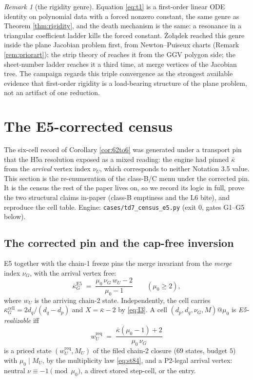 \documentclass[11pt]{article}
\theoremstyle{definition}
\theoremstyle{remark}
\newtheorem{remark}[theorem]{Remark}
\newcommand{\kb}{\bar\kappa}
\begin{document}
\begin{remark}[the rigidity genre]\label{rem:genre}
Equation \eqref{eq:t1} is a first-order linear ODE identity on polynomial data with a forced nonzero constant, the same genre as Theorem \ref{thm:rigidity}, and the death mechanism is the same: a resonance in a triangular coefficient ladder kills the forced constant. \.Zo{\l}\k{a}dek reached this genre inside the plane Jacobian problem first, from Newton--Puiseux charts (Remark \ref{rem:priorart}); the strip theory of \cite{P1} reaches it from the GGV polygon side; the sheet-number ladder reaches it a third time, at merge vertices of the Jacobian tree. The campaign regards this triple convergence as the strongest available evidence that first-order rigidity is a load-bearing structure of the plane problem, not an artifact of one reduction.
\end{remark}

\section{The E5-corrected census}\label{sec:census}

The six-cell record of Corollary \ref{cor:62to6} was generated under a transport pin that the H5a resolution exposed as a mixed reading: the engine had pinned $\kb$ from the \emph{arrival} vertex index $\nu_U$, which corresponds to neither Notation 3.5 value. This section is the re-enumeration of the class-B/C menu under the corrected pin. It is the census the rest of the paper lives on, so we record its logic in full, prove the two structural claims in-paper (class-B emptiness and the L6 bite), and reproduce the cell table. Engine: \texttt{cases/td7\_census\_e5.py} (exit 0, gates G1--G5 below).

\subsection{The corrected pin and the cap-free inversion}

E5 together with the chain-1 freeze pins the merge invariant from the \emph{merge} index $\nu_G$, with the arrival vertex free:
\begin{equation}\label{eq:I4}
\kb_G^{\mathrm{E5}}\;=\;\frac{\mu_0\,\nu_G\,w_U-2}{\mu_0-1}\qquad(\mu_0\geq2),
\tag{I4}
\end{equation}
where $w_U$ is the arriving chain-2 state. Independently, the cell carries $\kb_G^{\mathrm{cell}}=2d_q/(d_q-d_p)$ and $X=\kb-2$ by \eqref{eq:I3}. A cell $(d_p,d_q,\nu_G,M)@\mu_0$ is \emph{E5-realizable} iff
\[
w_U^{\mathrm{req}}\;=\;\frac{\kb(\mu_0-1)+2}{\mu_0\,\nu_G}
\]
is a priced state $(w_U^{\mathrm{req}},M_U)$ of the filed chain-2 closure ($69$ states, budget $5$) with $\mu_0\mid M_U$, by the multiplicity law \eqref{eq:st84}, and a P2-legal arrival vertex: neutral $\nu\equiv-1\pmod{\mu_0}$, a direct stored step-cell, or the entry.
\end{document}
